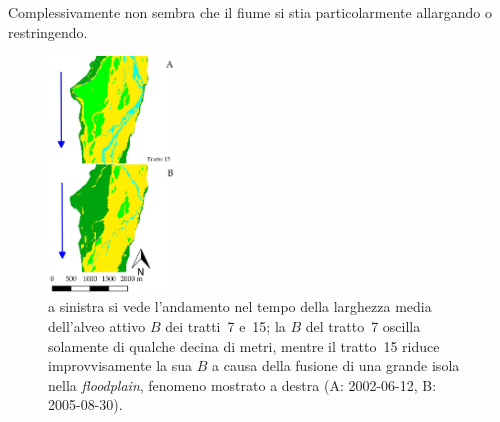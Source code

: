 Complessivamente non sembra che il fiume si stia particolarmente allargando o restringendo.
%
\begin{figure}
	\centering
	
	\quad
	\includegraphics[width=0.3\textwidth]{files/fusione_isola_tr_15.jpeg}
	\caption[andamento temporale di $B$ per i tratti~7 e~15]{a sinistra si vede l'andamento nel tempo della larghezza media dell'alveo attivo $B$ dei tratti~7 e~15; la $B$ del tratto~7 oscilla solamente di qualche decina di metri, mentre il tratto~15 riduce improvvisamente la sua $B$ a causa della fusione di una grande isola nella \emph{floodplain}, fenomeno mostrato a destra (A: 2002-06-12, B: 2005-08-30).}
	\label{fig:b-media-7-e-15}
\end{figure}
%

